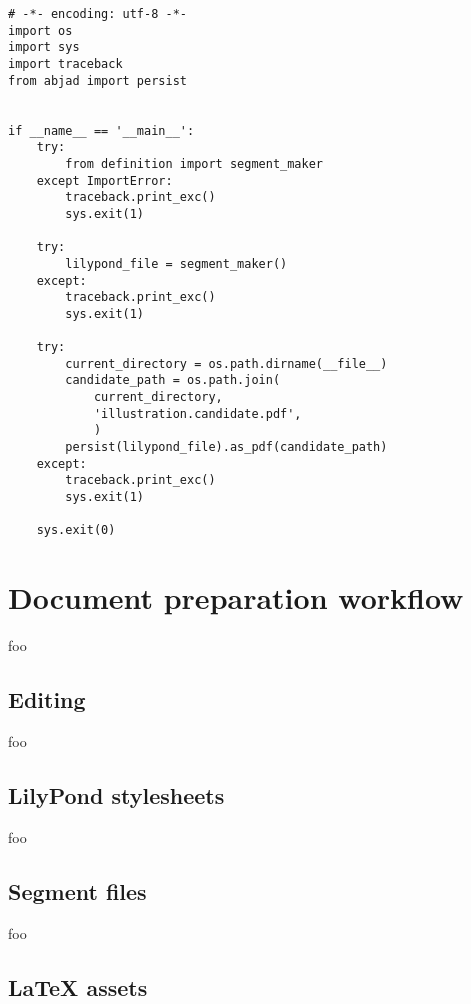 \begin{singlespacing}
\vspace{-0.5\baselineskip}
\begin{lstlisting}
# -*- encoding: utf-8 -*-
import os
import sys
import traceback
from abjad import persist


if __name__ == '__main__':
    try:
        from definition import segment_maker
    except ImportError:
        traceback.print_exc()
        sys.exit(1)

    try:
        lilypond_file = segment_maker()
    except:
        traceback.print_exc()
        sys.exit(1)

    try:
        current_directory = os.path.dirname(__file__)
        candidate_path = os.path.join(
            current_directory,
            'illustration.candidate.pdf',
            )
        persist(lilypond_file).as_pdf(candidate_path)
    except:
        traceback.print_exc()
        sys.exit(1)

    sys.exit(0)
\end{lstlisting}
\end{singlespacing}

\section{Document preparation workflow}

foo

\subsection{Editing}

foo

\subsection{LilyPond stylesheets}

foo

\subsection{Segment files}

foo

\subsection{LaTeX assets}


